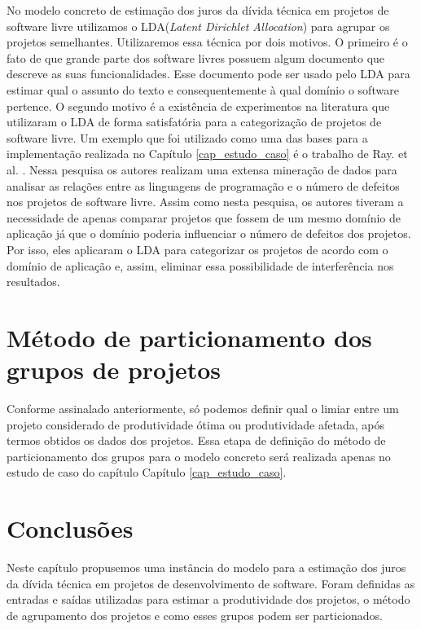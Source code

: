No modelo concreto de estimação dos juros da dívida técnica em projetos de software livre utilizamos o LDA(\textit{Latent Dirichlet Allocation}) para agrupar os projetos semelhantes. Utilizaremos essa técnica por dois motivos. O primeiro é o fato de que grande parte dos software livres possuem algum documento que descreve as suas funcionalidades. Esse documento pode ser usado pelo LDA para estimar qual o assunto do texto e consequentemente à qual domínio o software pertence. O segundo motivo é a existência de experimentos na literatura que utilizaram o LDA de forma satisfatória para a categorização de projetos de software livre. Um exemplo que foi utilizado como uma das bases para a implementação realizada no Capítulo \ref{cap_estudo_caso}  é o trabalho de Ray. et al. \cite{ray2014large}. Nessa pesquisa os autores realizam uma extensa mineração de dados para analisar as relações entre as linguagens de programação e o número de defeitos nos projetos de software livre. Assim como nesta pesquisa, os autores tiveram a necessidade de apenas comparar projetos que fossem de um mesmo domínio de aplicação já que o domínio poderia influenciar o número de defeitos dos projetos. Por isso, eles aplicaram o LDA para categorizar os projetos de acordo com o domínio de aplicação e, assim, eliminar essa possibilidade de interferência nos resultados.

\section{Método de particionamento dos grupos de projetos}

Conforme assinalado anteriormente, só podemos definir qual o limiar entre um projeto considerado de produtividade ótima ou produtividade afetada, após termos obtidos os dados dos projetos.  Essa etapa de definição do método de particionamento dos grupos para o modelo concreto será realizada apenas no estudo de caso do capítulo  Capítulo \ref{cap_estudo_caso}.


\section{Conclusões}
Neste capítulo propusemos uma instância do modelo para a estimação dos juros da dívida técnica em projetos de desenvolvimento de software. Foram definidas as entradas e saídas utilizadas para estimar a produtividade dos projetos, o método de agrupamento dos projetos e como esses grupos podem ser particionados. 

